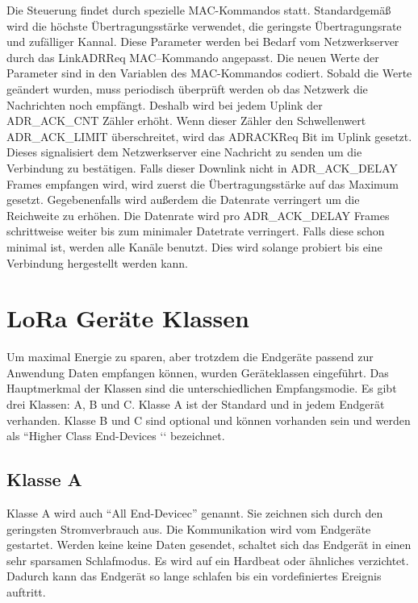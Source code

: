 \documentclass[a4paper, 12pt]{article}
\begin{document}
                Die Steuerung findet durch spezielle MAC-Kommandos statt. Standardgemäß wird die höchste 
                Übertragungsstärke verwendet, die geringste Übertragungsrate und zufälliger Kannal. Diese Parameter werden bei Bedarf 
                vom Netzwerkserver durch das LinkADRReq MAC–Kommando angepasst. Die 
                neuen Werte der Parameter sind in den Variablen des MAC-Kommandos codiert. Sobald die Werte geändert 
                wurden, muss periodisch überprüft werden ob das 
                Netzwerk die Nachrichten noch empfängt. Deshalb wird bei jedem Uplink der ADR\_ACK\_CNT Zähler erhöht. 
                Wenn dieser Zähler den Schwellenwert ADR\_ACK\_LIMIT
                überschreitet, wird das ADRACKReq Bit im Uplink gesetzt. Dieses signalisiert dem Netzwerkserver eine
                Nachricht zu senden um die Verbindung zu bestätigen. Falls dieser Downlink nicht in 
                ADR\_ACK\_DELAY Frames empfangen wird, wird zuerst die Übertragungsstärke auf das Maximum gesetzt. 
                Gegebenenfalls wird außerdem die Datenrate verringert um die Reichweite zu erhöhen. Die Datenrate wird 
                pro ADR\_ACK\_DELAY Frames schrittweise weiter bis zum minimaler Datetrate verringert. Falls diese schon 
                minimal ist, werden alle Kanäle benutzt. Dies wird solange probiert bis eine Verbindung 
                hergestellt werden kann. \cite[S.19 f]{LoRaSpec}         
    \section{LoRa Geräte Klassen} \label{sec:klassen}
        Um maximal Energie zu sparen, aber trotzdem die Endgeräte passend zur Anwendung Daten empfangen können, 
        wurden Geräteklassen eingeführt. Das Hauptmerkmal der Klassen sind die unterschiedlichen Empfangsmodie. 
        Es gibt drei Klassen: A, B und C. Klasse A ist der Standard und in jedem Endgerät verhanden. Klasse B 
        und C sind optional und können vorhanden sein und werden als ``Higher Class End-Devices ‘‘ bezeichnet. \cite[S.10]{LoRaSpec}
        \subsection{Klasse A}\label{sec:ClassA}
            Klasse A wird auch ``All End-Devicec'' genannt. Sie zeichnen sich durch den geringsten Stromverbrauch aus. Die 
            Kommunikation wird vom Endgeräte gestartet. Werden keine keine Daten gesendet, schaltet sich 
            das Endgerät in einen sehr sparsamen Schlafmodus. Es wird auf ein Hardbeat oder ähnliches verzichtet.
            Dadurch kann das Endgerät so lange schlafen bis ein vordefiniertes Ereignis auftritt. 
            
\end{document}
